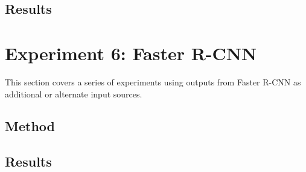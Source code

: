 \subsection{Results}


\section{Experiment 6: Faster R-CNN}
\label{sec:exp_6}
This section covers a series of experiments using outputs from Faster R-CNN as additional or alternate input sources. 
\subsection{Method}
\subsection{Results}

